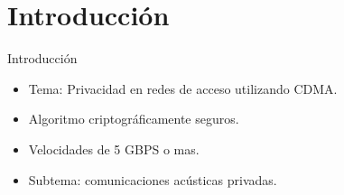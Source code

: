 \documentclass[aspectratio=169]{beamer}
\begin{document}
\section{Introducción}
\begin{frame}{Introducción}


\begin{itemize}
 \item Tema: Privacidad en redes de acceso utilizando CDMA.
 \item Algoritmo criptográficamente seguros.
 \item Velocidades de 5 GBPS o mas.
 \item Subtema: comunicaciones \color{red}acústicas \color{black} privadas.
\end{itemize}


  \begin{figure}[!t]
   \centering
   \qquad
   \qquad
  \label{fig:ImgOjo}
\end{figure}


\end{frame}
\end{document}
